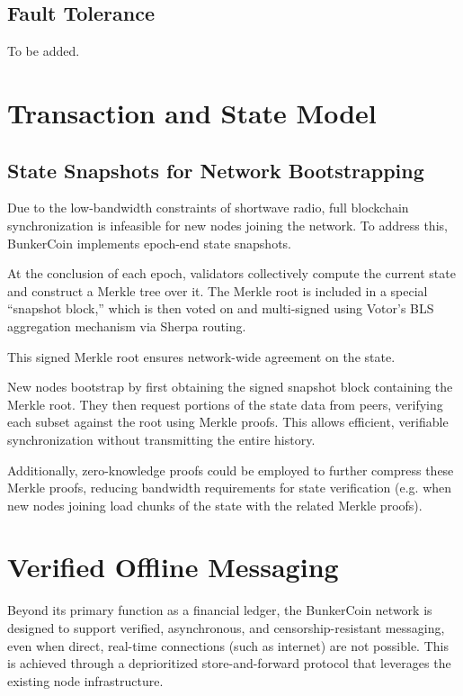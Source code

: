 \documentclass{article}
\begin{document}
\subsection{Fault Tolerance}

To be added.

\section{Transaction and State Model}
\label{sec:transaction_state}

\subsection{State Snapshots for Network Bootstrapping}

Due to the low-bandwidth constraints of shortwave radio, full blockchain synchronization is infeasible for new nodes joining the network. To address this, BunkerCoin implements epoch-end state snapshots.

At the conclusion of each epoch, validators collectively compute the current state and construct a Merkle tree over it. The Merkle root is included in a special ``snapshot block,'' which is then voted on and multi-signed using Votor's BLS aggregation mechanism via Sherpa routing.

This signed Merkle root ensures network-wide agreement on the state.

New nodes bootstrap by first obtaining the signed snapshot block containing the Merkle root. They then request portions of the state data from peers, verifying each subset against the root using Merkle proofs. This allows efficient, verifiable synchronization without transmitting the entire history.

Additionally, zero-knowledge proofs could be employed to further compress these Merkle proofs, reducing bandwidth requirements for state verification (e.g. when new nodes joining load chunks of the state with the related Merkle proofs).

\section{Verified Offline Messaging}
\label{sec:messaging}

Beyond its primary function as a financial ledger, the BunkerCoin network is designed to support verified, asynchronous, and censorship-resistant messaging, even when direct, real-time connections (such as internet) are not possible. This is achieved through a deprioritized store-and-forward protocol that leverages the existing node infrastructure.
\end{document}
